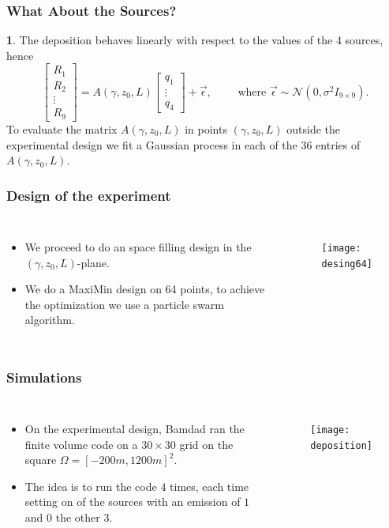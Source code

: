 \documentclass[11pt]{beamer}
\theoremstyle{plain}
\theoremstyle{definition}
\newtheorem{dfn}{}[section]
\newcommand\ChangeFont{\fontsize{9}{7.2}\selectfont}
\begin{document}
\begin{frame}
\frametitle{What About the Sources?}

\begin{dfn}
The deposition behaves linearly  with respect to the values of the 4  sources,
hence
\begin{equation*}
\begin{bmatrix}
R_{1} \\
R_{2} \\
\vdots\\
R_{9}
\end{bmatrix}=A(\gamma,z_{0},L)
\begin{bmatrix}
q_{1}\\
\vdots\\
q_{4}
\end{bmatrix}
+\vec{\epsilon},\qquad\text{ where } \vec{\epsilon}\sim\mathcal{N}(0,
\sigma^{2}I_{9\times 9}).
\end{equation*}
To evaluate the matrix $A(\gamma,z_{0},L)$ in points $(\gamma,z_{0},L)$ outside the experimental design we fit a 
Gaussian process in each of the 36 entries of $A(\gamma,z_{0},L)$.
\end{dfn}
\end{frame}

\begin{frame}
\frametitle{Design of the experiment}
\begin{columns}[c]
\column{1.5in}
\begin{itemize}
\item We proceed to do an space filling design in the $(\gamma,z_{0},L)$-plane.
\item We do a MaxiMin design on 64 points, to achieve the optimization we use a particle swarm 
algorithm.
\end{itemize}
\column{1.5in}
\begin{figure}
\texttt{[image: desing64]}
\end{figure}
\end{columns}
\end{frame}
\begin{frame}
\frametitle{Simulations}
\ChangeFont
\begin{columns}[c]
\column{1.5in}
\begin{itemize}
\item On the experimental design, Bamdad ran the finite volume code on a 
$30\times 30$ grid on the square $\Omega=[-200m,1200 m]^{2}$. 

\item The idea is to run the code $4$ times, each time setting on of the sources
with an emission of $1$ and $0$ the other $3$.
\end{itemize}

\column{1.5in}
\begin{figure}
\texttt{[image: deposition]}
\end{figure}


\end{columns}

\end{frame}
\end{document}
